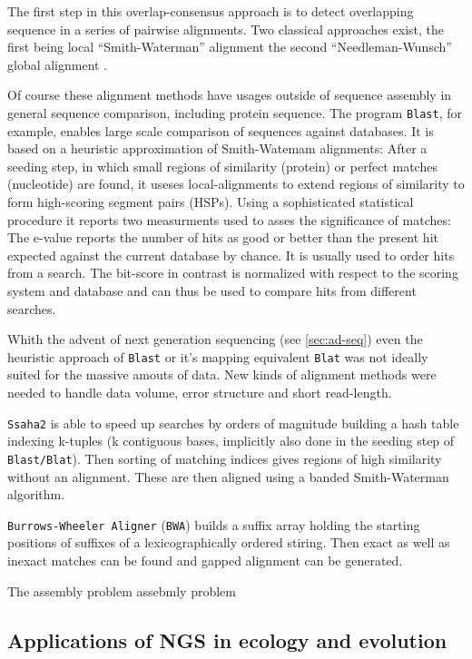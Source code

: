 The first step in this overlap-consensus approach is to detect
overlapping sequence in a series of pairwise alignments. Two classical
approaches exist, the first being local ``Smith-Waterman'' alignment
\cite{pmid7265238} the second ``Needleman-Wunsch'' global alignment
\cite{pmid7334527}.

Of course these alignment methods have usages outside of sequence
assembly in general sequence comparison, including protein
sequence. The program \texttt{Blast}, for example, enables large scale
comparison of sequences against databases. It is based on a heuristic
approximation of Smith-Watemam alignments: After a seeding step, in
which small regions of similarity (protein) or perfect matches
(nucleotide) are found, it useses local-alignments to extend regions
of similarity to form high-scoring segment pairs (HSPs). Using a
sophisticated statistical procedure it reports two measurments used to
asses the significance of matches: The e-value reports the number of
hits as good or better than the present hit expected against the
current database by chance. It is usually used to order hits from a
search. The bit-score in contrast is normalized with respect to the
scoring system and database and can thus be used to compare hits from
different searches.

Whith the advent of next generation sequencing (see \ref{sec:ad-seq})
even the heuristic approach of \texttt{Blast} or it's mapping
equivalent \texttt{Blat} \cite{pmid11932250} was not ideally suited
for the massive amouts of data. New kinds of alignment methods were
needed to handle data volume, error structure and short read-length.

\texttt{Ssaha2} \cite{pmid11591649} is able to speed up searches by
orders of magnitude building a hash table indexing k-tuples (k
contiguous bases, implicitly also done in the seeding step of
\texttt{Blast/Blat}). Then sorting of matching indices gives regions
of high similarity without an alignment. These are then aligned using
a banded Smith-Waterman algorithm.

\texttt{Burrows-Wheeler Aligner} (\texttt{BWA}) \cite{pmid20080505}
builds a suffix array holding the starting positions of suffixes of a
lexicographically ordered stiring. Then exact as well as inexact
matches can be found and gapped alignment can be generated.

The assembly problem assebmly problem 



\subsection{Applications of NGS in ecology and evolution}
\label{sec:appl-ngs}

